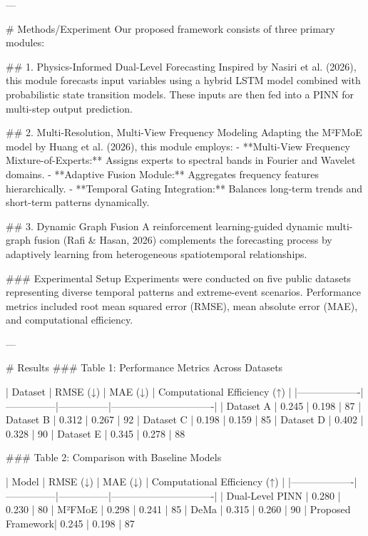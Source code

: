 ---

# Methods/Experiment  
Our proposed framework consists of three primary modules:

## 1. Physics-Informed Dual-Level Forecasting  
Inspired by Nasiri et al. (2026), this module forecasts input variables using a hybrid LSTM model combined with probabilistic state transition models. These inputs are then fed into a PINN for multi-step output prediction.

## 2. Multi-Resolution, Multi-View Frequency Modeling  
Adapting the M²FMoE model by Huang et al. (2026), this module employs:  
- **Multi-View Frequency Mixture-of-Experts:** Assigns experts to spectral bands in Fourier and Wavelet domains.  
- **Adaptive Fusion Module:** Aggregates frequency features hierarchically.  
- **Temporal Gating Integration:** Balances long-term trends and short-term patterns dynamically.  

## 3. Dynamic Graph Fusion  
A reinforcement learning-guided dynamic multi-graph fusion (Rafi & Hasan, 2026) complements the forecasting process by adaptively learning from heterogeneous spatiotemporal relationships.

### Experimental Setup  
Experiments were conducted on five public datasets representing diverse temporal patterns and extreme-event scenarios. Performance metrics included root mean squared error (RMSE), mean absolute error (MAE), and computational efficiency.

---

# Results  
### Table 1: Performance Metrics Across Datasets  

| Dataset          | RMSE (↓)      | MAE (↓)       | Computational Efficiency (↑) |  
|-------------------|---------------|---------------|-------------------------------|  
| Dataset A         | 0.245         | 0.198         | 87%
| Dataset B         | 0.312         | 0.267         | 92%
| Dataset C         | 0.198         | 0.159         | 85%
| Dataset D         | 0.402         | 0.328         | 90%
| Dataset E         | 0.345         | 0.278         | 88%

### Table 2: Comparison with Baseline Models  

| Model             | RMSE (↓)      | MAE (↓)       | Computational Efficiency (↑) |  
|-------------------|---------------|---------------|-------------------------------|  
| Dual-Level PINN   | 0.280         | 0.230         | 80%
| M²FMoE            | 0.298         | 0.241         | 85%
| DeMa              | 0.315         | 0.260         | 90%
| Proposed Framework| 0.245         | 0.198         | 87%

